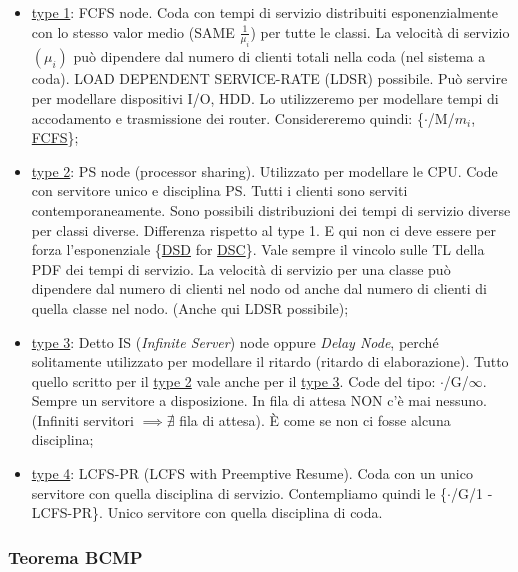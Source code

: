 \begin{itemize}

\item{\underline{type 1}}: FCFS node. Coda con tempi di servizio distribuiti esponenzialmente con lo stesso valor medio (SAME $\frac{1}{\mu_i}$) per tutte le classi. La velocità di servizio $(\mu_i)$ può dipendere dal numero di clienti totali nella coda (nel sistema a coda). LOAD DEPENDENT SERVICE-RATE (LDSR) possibile. Può servire per modellare dispositivi I/O, HDD. Lo utilizzeremo per modellare tempi di accodamento e trasmissione dei router. Considereremo quindi: \{$\mathord{\cdot}$/M/$m_i$, \underline{FCFS}\};

\item{\underline{type 2}}: PS node (processor sharing). Utilizzato per modellare le CPU. Code con servitore unico e disciplina PS. Tutti i clienti sono serviti contemporaneamente. Sono possibili distribuzioni dei tempi di servizio diverse per classi diverse. Differenza rispetto al type 1. E qui non ci deve essere per forza l'esponenziale \{\underline{DSD} for \underline{DSC}\}. Vale sempre il vincolo sulle TL della PDF dei tempi di servizio. La velocità di servizio per una classe può dipendere dal numero di clienti nel nodo od anche dal numero di clienti di quella classe nel nodo. (Anche qui LDSR possibile);

\item{\underline{type 3}}: Detto IS (\textit{Infinite Server}) node oppure \textit{Delay Node}, perché solitamente utilizzato per modellare il ritardo (ritardo di elaborazione). Tutto quello scritto per il \underline{type 2} vale anche per il \underline{type 3}. Code del tipo: $\mathord{\cdot}$/G/$\infty$. Sempre un servitore a disposizione. In fila di attesa NON c'è mai nessuno. (Infiniti servitori $\implies \nexists$ fila di attesa). \`E come se non ci fosse alcuna disciplina;

\item{\underline{type 4}}: LCFS-PR (LCFS with Preemptive Resume). Coda con un unico servitore con quella disciplina di servizio. Contempliamo quindi le \{$\mathord{\cdot}$/G/1 - LCFS-PR\}. Unico servitore con quella disciplina di coda.

\end{itemize}

\subsubsection{Teorema BCMP}

